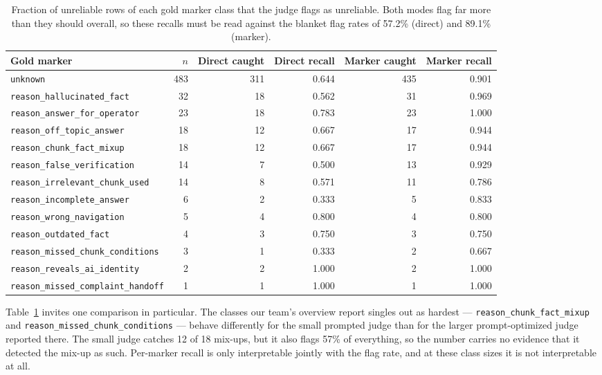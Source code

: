 \documentclass{zapiski}
\begin{document}
\begin{table}[H]
\centering
\caption{Fraction of unreliable rows of each gold marker class that the judge
flags as unreliable. Both modes flag far more than they should overall, so
these recalls must be read against the blanket flag rates of 57.2\% (direct)
and 89.1\% (marker).}
\label{tab:per-marker-recall}
\footnotesize
\begin{tabular}{lrrrrr}
\toprule
Gold marker & $n$ & Direct caught & Direct recall & Marker caught & Marker recall \\
\midrule
\texttt{unknown}                          & 483 & 311 & 0.644 & 435 & 0.901 \\
\texttt{reason\_hallucinated\_fact}       &  32 &  18 & 0.562 &  31 & 0.969 \\
\texttt{reason\_answer\_for\_operator}    &  23 &  18 & 0.783 &  23 & 1.000 \\
\texttt{reason\_off\_topic\_answer}       &  18 &  12 & 0.667 &  17 & 0.944 \\
\texttt{reason\_chunk\_fact\_mixup}       &  18 &  12 & 0.667 &  17 & 0.944 \\
\texttt{reason\_false\_verification}      &  14 &   7 & 0.500 &  13 & 0.929 \\
\texttt{reason\_irrelevant\_chunk\_used}  &  14 &   8 & 0.571 &  11 & 0.786 \\
\texttt{reason\_incomplete\_answer}       &   6 &   2 & 0.333 &   5 & 0.833 \\
\texttt{reason\_wrong\_navigation}        &   5 &   4 & 0.800 &   4 & 0.800 \\
\texttt{reason\_outdated\_fact}           &   4 &   3 & 0.750 &   3 & 0.750 \\
\texttt{reason\_missed\_chunk\_conditions}&   3 &   1 & 0.333 &   2 & 0.667 \\
\texttt{reason\_reveals\_ai\_identity}    &   2 &   2 & 1.000 &   2 & 1.000 \\
\texttt{reason\_missed\_complaint\_handoff}& 1 &   1 & 1.000 &   1 & 1.000 \\
\bottomrule
\end{tabular}
\end{table}

Table~\ref{tab:per-marker-recall} invites one comparison in particular.
The classes our team's overview report singles out as hardest ---
\texttt{reason\_chunk\_fact\_mixup} and
\texttt{reason\_missed\_chunk\_conditions} --- behave differently for the
small prompted judge than for the larger prompt-optimized judge reported
there. The small judge catches 12 of 18 mix-ups, but it also flags 57\% of
everything, so the number carries no evidence that it detected the mix-up as
such. Per-marker recall is only interpretable jointly with the flag rate, and
at these class sizes it is not interpretable at all.
\end{document}
